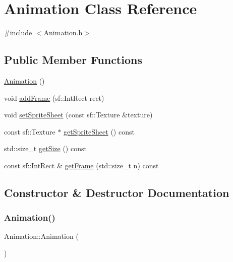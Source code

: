 \hypertarget{class_animation}{}\section{Animation Class Reference}
\label{class_animation}


{\ttfamily \#include $<$Animation.\+h$>$}

\subsection*{Public Member Functions}
\begin{DoxyCompactItemize}
\item 
\hyperlink{class_animation_a83f0a16cef7117f187ad596de38dd9d6}{Animation} ()
\item 
void \hyperlink{class_animation_a486ee5fa2d40ae90f227a19866998c91}{add\+Frame} (sf\+::\+Int\+Rect rect)
\item 
void \hyperlink{class_animation_a2fb16f452a323d51a0104c0aa454cab3}{set\+Sprite\+Sheet} (const sf\+::\+Texture \&texture)
\item 
const sf\+::\+Texture $\ast$ \hyperlink{class_animation_abf4f00f8b1657829583d7d92e71b93d1}{get\+Sprite\+Sheet} () const
\item 
std\+::size\+\_\+t \hyperlink{class_animation_ac6854dc96e9fc8ffd97feba43547c869}{get\+Size} () const
\item 
const sf\+::\+Int\+Rect \& \hyperlink{class_animation_a8cf30a3b19ba104eeb34b08f45cfabe2}{get\+Frame} (std\+::size\+\_\+t n) const
\end{DoxyCompactItemize}


\subsection{Constructor \& Destructor Documentation}
\mbox{\label{class_animation_a83f0a16cef7117f187ad596de38dd9d6}} 
\subsubsection{\texorpdfstring{Animation()}{Animation()}}
{\footnotesize\ttfamily Animation\+::\+Animation (\begin{DoxyParamCaption}{ }\end{DoxyParamCaption})}



